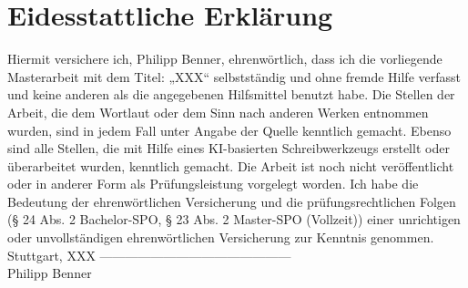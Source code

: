 \chapter*{Eidesstattliche Erklärung}
\thispagestyle{plain}


Hiermit versichere ich, Philipp Benner, ehrenwörtlich, dass ich die vorliegende
Masterarbeit mit dem Titel: „XXX“ selbstständig und ohne fremde Hilfe verfasst und keine anderen als die angegebenen
Hilfsmittel benutzt habe. Die Stellen der Arbeit, die dem Wortlaut oder dem Sinn nach anderen Werken
entnommen wurden, sind in jedem Fall unter Angabe der Quelle kenntlich gemacht. Ebenso sind alle
Stellen, die mit Hilfe eines KI-basierten Schreibwerkzeugs erstellt oder überarbeitet wurden, kenntlich
gemacht. Die Arbeit ist noch nicht veröffentlicht oder in anderer Form als Prüfungsleistung vorgelegt
worden.
Ich habe die Bedeutung der ehrenwörtlichen Versicherung und die prüfungsrechtlichen Folgen
(§ 24 Abs. 2 Bachelor-SPO, § 23 Abs. 2 Master-SPO (Vollzeit)) einer unrichtigen oder unvollständigen ehrenwörtlichen Versicherung zur Kenntnis genommen.
\newline
\newline
\newline
\newline
\newline
Stuttgart, XXX
\newline
\newline
\newline
---------------------------------------------\\
Philipp Benner


